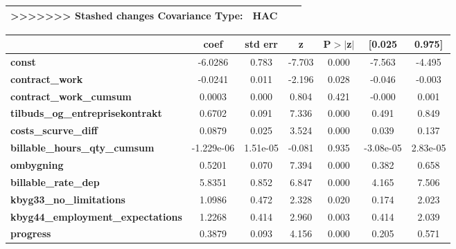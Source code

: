 \begin{center}
\begin{tabular}{lclc}
>>>>>>> Stashed changes
\textbf{Covariance Type:}                   &         HAC         & \textbf{                     } &             \\
\bottomrule
\end{tabular}
\begin{tabular}{lcccccc}
                                            & \textbf{coef} & \textbf{std err} & \textbf{z} & \textbf{P$> |$z$|$} & \textbf{[0.025} & \textbf{0.975]}  \\
\midrule
\textbf{const}                              &      -6.0286  &        0.783     &    -7.703  &         0.000        &       -7.563    &       -4.495     \\
\textbf{contract\_work}                     &      -0.0241  &        0.011     &    -2.196  &         0.028        &       -0.046    &       -0.003     \\
\textbf{contract\_work\_cumsum}             &       0.0003  &        0.000     &     0.804  &         0.421        &       -0.000    &        0.001     \\
\textbf{tilbuds\_og\_entreprisekontrakt}    &       0.6702  &        0.091     &     7.336  &         0.000        &        0.491    &        0.849     \\
\textbf{costs\_scurve\_diff}                &       0.0879  &        0.025     &     3.524  &         0.000        &        0.039    &        0.137     \\
\textbf{billable\_hours\_qty\_cumsum}       &   -1.229e-06  &     1.51e-05     &    -0.081  &         0.935        &    -3.08e-05    &     2.83e-05     \\
\textbf{ombygning}                          &       0.5201  &        0.070     &     7.394  &         0.000        &        0.382    &        0.658     \\
\textbf{billable\_rate\_dep}                &       5.8351  &        0.852     &     6.847  &         0.000        &        4.165    &        7.506     \\
\textbf{kbyg33\_no\_limitations}            &       1.0986  &        0.472     &     2.328  &         0.020        &        0.174    &        2.023     \\
\textbf{kbyg44\_employment\_expectations}   &       1.2268  &        0.414     &     2.960  &         0.003        &        0.414    &        2.039     \\
\textbf{progress}                           &       0.3879  &        0.093     &     4.156  &         0.000        &        0.205    &        0.571     \\

\end{tabular}
\end{center}
